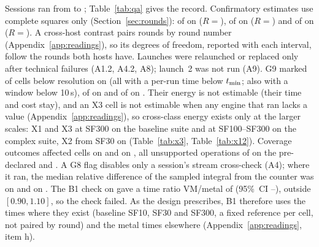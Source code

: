 \documentclass[sigconf]{acmart}
\begin{document}
Sessions ran from  to ; Table~\ref{tab:qa}
gives the record. Confirmatory estimates use complete squares only (Section~\ref{sec:rounds}):
 of  on \GH{}
($R={}$),  of
 on \GA{} ($R={}$) and
 of  on \CG{}
($R={}$). A cross-host contrast pairs rounds by round number
(Appendix~\ref{app:readings}), so its degrees of freedom, reported with each interval, follow the
rounds both hosts have. Launches were relaunched or replaced only after technical failures (A1.2,
A4.2, A8); \CG{} launch~2 was not run (A9). G9 marked  of
 cells below resolution on \GH{} (all with a per-run time below
$t_{\min}$;  also with a window below 10\,s),
 of  on \GA{} and
 of  on \CG. Their energy is
not estimable (their time and cost stay), and an X3 cell is not estimable when any engine that ran lacks a
value (Appendix~\ref{app:readings}), so cross-class energy exists only at the larger scales: X1 and X3 at
SF300 on the baseline suite and at SF100--SF300 on the complex suite, X2 from SF30 on (Table~\ref{tab:x3},
Table~\ref{tab:x12}). Coverage outcomes affected  cells on
\GH{} and  on \GA, all unsupported operations of \polarsgpu{} on
the pre-declared  and . A G8 flag disables only a session's stream
cross-check (A4); where it ran, the median relative difference of the sampled integral from the counter
was  on \GH{} and  on \GA.
The B1 check on \CV{} gave a time ratio VM/metal of  (95\%~CI
--), outside $[0.90, 1.10]$, so the check failed. As the design
prescribes, B1 therefore uses the \CV{} times where they exist (baseline SF10, SF30 and SF300, a fixed
reference per cell, not paired by round) and the metal times elsewhere (Appendix~\ref{app:readings}, item h).
\end{document}
